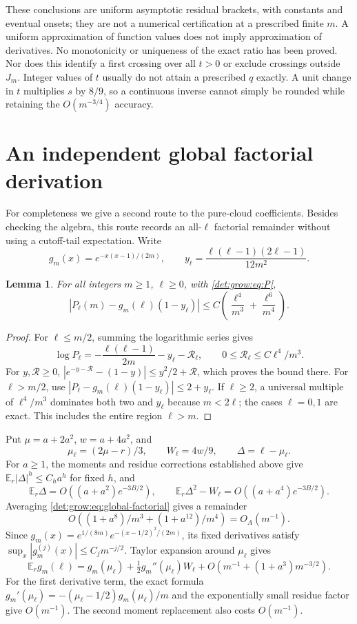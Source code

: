 \documentclass[11pt,letterpaper]{article}
\numberwithin{equation}{section}
\newtheorem{lemma}[theorem]{Lemma}
\theoremstyle{definition}\newtheorem{definition}[theorem]{Definition}
\theoremstyle{remark}\newtheorem{remark}[theorem]{Remark}
\newcommand{\E}{\mathbb E}
\begin{document}
These conclusions are uniform asymptotic residual brackets, with
constants and eventual onsets; they are not a numerical certification
at a prescribed finite $m$. A uniform approximation of function values
does not imply approximation of derivatives. No monotonicity or
uniqueness of the exact ratio has been proved. Nor does this identify
a first crossing over all $t>0$ or exclude crossings outside $J_m$.
Integer values of $t$ usually do not attain a prescribed $q$ exactly.
A unit change in $t$ multiplies $s$ by $8/9$, so a continuous inverse
cannot simply be rounded while retaining the $O(m^{-3/4})$ accuracy.

\section{An independent global factorial derivation}\label{det:grow:sec:second}
For completeness we give a second route to the pure-cloud coefficients.
Besides checking the algebra, this route records an all-$\ell$ factorial
remainder without using a cutoff-tail expectation. Write
\[
 g_m(x)=e^{-x(x-1)/(2m)},\qquad
 y_\ell=\frac{\ell(\ell-1)(2\ell-1)}{12m^2}.
\]
\begin{lemma}\label{det:grow:lem:global-factorial}
For all integers $m\ge1$, $\ell\ge0$, with \eqref{det:grow:eq:P},
\begin{equation}\label{det:grow:eq:global-factorial}
 |P_\ell(m)-g_m(\ell)(1-y_\ell)|
 \le C\left(\frac{\ell^4}{m^3}+\frac{\ell^6}{m^4}\right).
\end{equation}
\end{lemma}
\begin{proof}
For $\ell\le m/2$, summing the logarithmic series gives
\[
 \log P_\ell=-\frac{\ell(\ell-1)}{2m}-y_\ell-\mathcal R_\ell,
 \qquad0\le\mathcal R_\ell\le C\ell^4/m^3.
\]
For $y,\mathcal R\ge0$,
$|e^{-y-\mathcal R}-(1-y)|\le y^2/2+\mathcal R$, which proves the
bound there. For $\ell>m/2$, use
$|P_\ell-g_m(\ell)(1-y_\ell)|\le2+y_\ell$.
If $\ell\ge2$, a universal multiple of $\ell^4/m^3$ dominates both
two and $y_\ell$ because $m<2\ell$; the cases $\ell=0,1$ are exact.
This includes the entire region $\ell>m$.
\end{proof}

Put $\mu=a+2a^2$, $w=a+4a^2$, and
\[
 \mu_\ell=(2\mu-r)/3,\qquad W_\ell=4w/9,\qquad
 \Delta=\ell-\mu_\ell.
\]
For $a\ge1$, the moments and residue corrections established above give
$\E_r|\Delta|^h\le C_h a^h$ for fixed $h$, and
\[
 \E_r\Delta=O((a+a^2)e^{-3B/2}),\qquad
 \E_r\Delta^2-W_\ell=O((a+a^4)e^{-3B/2}).
\]
Averaging \eqref{det:grow:eq:global-factorial} gives a remainder
\[
 O\left((1+a^8)/m^3+(1+a^{12})/m^4\right)=O_A(m^{-1}).
\]
Since $g_m(x)=e^{1/(8m)}e^{-(x-1/2)^2/(2m)}$, its fixed derivatives
satisfy $\sup_x|g_m^{(j)}(x)|\le C_jm^{-j/2}$. Taylor expansion around
$\mu_\ell$ gives
\begin{equation}\label{det:grow:eq:gaussianaverage}
 \E_r g_m(\ell)=g_m(\mu_\ell)+\tfrac12g_m''(\mu_\ell)W_\ell
 +O\left(m^{-1}+(1+a^3)m^{-3/2}\right).
\end{equation}
For the first derivative term, the exact formula
$g_m'(\mu_\ell)=-(\mu_\ell-1/2)g_m(\mu_\ell)/m$ and the exponentially
small residue factor give $O(m^{-1})$. The second moment replacement
also costs $O(m^{-1})$.
\end{document}
